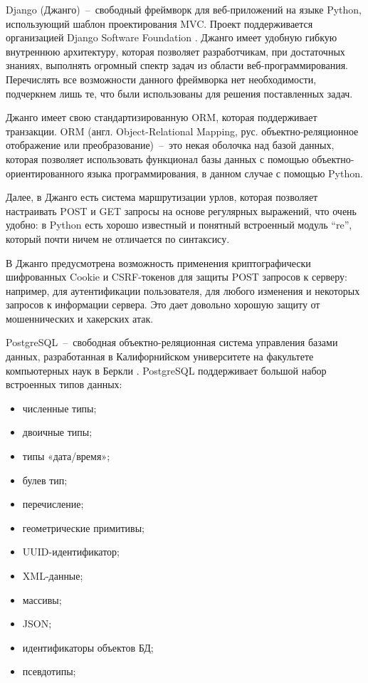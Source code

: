 Django (Джанго)~--~свободный фреймворк для веб-приложений на языке Python, использующий шаблон проектирования MVC.
Проект поддерживается организацией Django Software Foundation \cite{Django}. Джанго имеет удобную гибкую
внутреннюю архитектуру, которая позволяет разработчикам, при достаточных знаниях, выполнять огромный спектр задач
из области веб-программирования. Перечислять все возможности данного фреймворка нет необходимости, подчеркнем лишь те,
что были использованы для решения поставленных задач.

Джанго имеет свою стандартизированную ORM, которая поддерживает транзакции. ORM (англ. Object-Relational Mapping,
рус. объектно-реляционное отображение или преобразование)~--~это некая оболочка над базой данных, которая позволяет
использовать функционал базы данных с помощью объектно-ориентированного языка программирования, в данном случае с помощью Python.

Далее, в Джанго есть система маршрутизации урлов, которая позволяет настраивать POST и GET запросы на основе регулярных выражений,
что очень удобно: в Python есть хорошо известный и понятный встроенный модуль “re”, который почти ничем не отличается по синтаксису.

В Джанго предусмотрена возможность применения криптографически шифрованных Cookie и CSRF-токенов для защиты POST
запросов к серверу: например, для аутентификации пользователя, для любого изменения и некоторых запросов к информации сервера.
Это дает довольно хорошую защиту от мошеннических и хакерских атак.

PostgreSQL~--~свободная объектно-реляционная система управления базами данных, разработанная в Калифорнийском
университете на факультете компьютерных наук в Беркли \cite{PostgreSQL}. PostgreSQL поддерживает большой набор встроенных типов данных:
\begin{itemize}
\item численные типы;
\item двоичные типы;
\item типы «дата/время»;
\item булев тип;
\item перечисление;
\item геометрические примитивы;
\item UUID-идентификатор;
\item XML-данные;
\item массивы;
\item JSON;
\item идентификаторы объектов БД;
\item псевдотипы;
\end{itemize}

